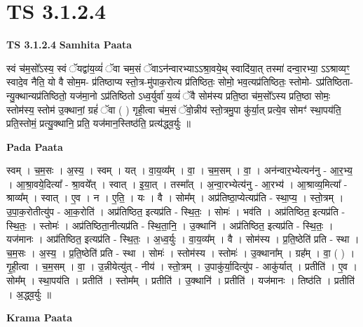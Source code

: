 \documentclass[17pt]{extarticle}
\begin{document}
\section{ TS 3.1.2.4 }

\textbf{TS 3.1.2.4 } \newline
\textbf{Samhita Paata} \newline

स्वं च॑म॒सो᳚ऽस्य॒ स्वं ॅयद्वा॑य॒व्यं॑ ॅवा चम॒सं ॅवाऽन॑न्वारभ्याऽऽश्रा॒वये॒थ् स्वादि॑या॒त् तस्मा॑ दन्वा॒रभ्या॒ ऽऽश्राव्यꣳ॒॒ स्वादे॒व नैति॒ यो वै सोम॒म- प्र॑तिष्ठाप्य स्तो॒त्र-मु॑पाक॒रोत्य प्र॑तिष्ठितः॒ सोमो॒ भव॒त्यप्र॑तिष्ठितः॒ स्तोमो- ऽप्र॑तिष्ठिता-न्यु॒क्थान्यप्र॑तिष्ठितो॒ यज॑मा॒नो ऽप्र॑तिष्ठितो ऽध्व॒र्युर्वा॑ य॒व्यं॑ ॅवै सोम॑स्य प्रति॒ष्ठा च॑म॒सो᳚ऽस्य प्रति॒ष्ठा सोमः॒ स्तोम॑स्य॒ स्तोम॑ उ॒क्थानां॒ ग्रहं॑ ॅवा ( ) गृही॒त्वा च॑म॒सं ॅवो॒न्नीय॑ स्तो॒त्रमु॒पा कु॑र्या॒त् प्रत्ये॒व सोमꣳ॑ स्था॒पय॑ति॒ प्रति॒स्तोमं॒ प्रत्यु॒क्थानि॒ प्रति॒ यज॑मान॒स्तिष्ठ॑ति॒ प्रत्य॑द्ध्व॒र्युः ॥ \newline

\textbf{Pada Paata} \newline

स्वम् । च॒म॒सः । अ॒स्य॒ । स्वम् । यत् । वा॒य॒व्य᳚म् । वा॒ । च॒म॒सम् । वा॒ । अन॑न्वार॒भ्येत्यन॑नु - आ॒र॒भ्य॒ । आ॒श्रा॒वये॒दित्या᳚ - श्रा॒वये᳚त् । स्वात् । इ॒या॒त् । तस्मा᳚त् । अ॒न्वा॒रभ्येत्य॑नु - आ॒रभ्य॑ । आ॒श्राव्य॒मित्या᳚ - श्राव्य᳚म् । स्वात् । ए॒व । न । ए॒ति॒ । यः । वै । सोम᳚म् । अप्र॑तिष्ठा॒प्येत्यप्र॑ति - स्था॒प्य॒ । स्तो॒त्रम् । उ॒पा॒क॒रोतीत्यु॑प - आ॒क॒रोति॑ । अप्र॑तिष्ठित॒ इत्यप्र॑ति - स्थि॒तः॒ । सोमः॑ । भव॑ति । अप्र॑तिष्ठित॒ इत्यप्र॑ति - स्थि॒तः॒ । स्तोमः॑ । अप्र॑तिष्ठिता॒नीत्यप्र॑ति - स्थि॒ता॒नि॒ । उ॒क्थानि॑ । अप्र॑तिष्ठित॒ इत्यप्र॑ति - स्थि॒तः॒ । यज॑मानः । अप्र॑तिष्ठित॒ इत्यप्र॑ति - स्थि॒तः॒ । अ॒ध्व॒र्युः । वा॒य॒व्य᳚म् । वै । सोम॑स्य । प्र॒ति॒ष्ठेति॑ प्रति - स्था । च॒म॒सः । अ॒स्य॒ । प्र॒ति॒ष्ठेति॑ प्रति - स्था । सोमः॑ । स्तोम॑स्य । स्तोमः॑ । उ॒क्थाना᳚म् । ग्रह᳚म् । वा॒ ( ) । गृ॒ही॒त्वा । च॒म॒सम् । वा॒ । उ॒न्नीयेत्यु॑त् - नीय॑ । स्तो॒त्रम् । उ॒पाकु॑र्या॒दित्यु॑प - आकु॑र्यात् । प्रतीति॑ । ए॒व । सोम᳚म् । स्था॒पय॑ति । प्रतीति॑ । स्तोम᳚म् । प्रतीति॑ । उ॒क्थानि॑ । प्रतीति॑ । यज॑मानः । तिष्ठ॑ति । प्रतीति॑ । अ॒द्ध्व॒र्युः ॥  \newline


\textbf{Krama Paata} \newline
\end{document}
